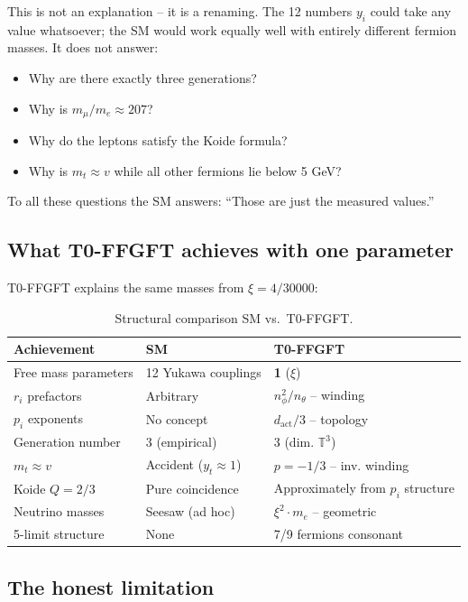 This is not an explanation -- it is a renaming. The 12 numbers $y_i$
could take any value whatsoever; the SM would work equally well with
entirely different fermion masses. It does not answer:
\begin{itemize}
    \item Why are there exactly three generations?
    \item Why is $m_\mu/m_e \approx 207$?
    \item Why do the leptons satisfy the Koide formula?
    \item Why is $m_t \approx v$ while all other fermions lie below 5 GeV?
\end{itemize}

To all these questions the SM answers: ``Those are just the measured values.''

\subsection{What T0-FFGFT achieves with one parameter}

T0-FFGFT explains the same masses from $\xi = 4/30000$:

\begin{table}[htbp]
\centering\footnotesize
\begin{tabular}{lll}
\toprule
\textbf{Achievement} & \textbf{SM} & \textbf{T0-FFGFT} \\
\midrule
Free mass parameters  & 12 Yukawa couplings & \textbf{1} ($\xi$) \\
$r_i$ prefactors      & Arbitrary & $n_\phi^2/n_\theta$ -- winding \\
$p_i$ exponents       & No concept & $d_{\text{act}}/3$ -- topology \\
Generation number     & 3 (empirical) & 3 (dim. $\mathbb{T}^3$) \\
$m_t \approx v$       & Accident ($y_t \approx 1$) & $p=-1/3$ -- inv. winding \\
Koide $Q=2/3$         & Pure coincidence & Approximately from $p_i$ structure \\
Neutrino masses       & Seesaw (ad hoc) & $\xi^2 \cdot m_e$ -- geometric \\
5-limit structure     & None & 7/9 fermions consonant \\
\bottomrule
\end{tabular}
\caption{Structural comparison SM vs.\ T0-FFGFT.}
\label{tab:sm_comparison}
\end{table}

\subsection{The honest limitation}

